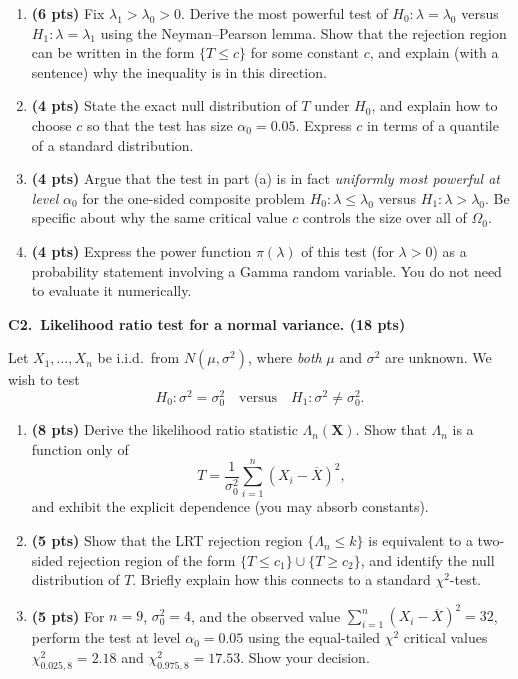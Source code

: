 \documentclass[11pt]{article}
\begin{document}
\begin{enumerate}[label=(\alph*), leftmargin=*]
    \item \textbf{(6 pts)} Fix $\lambda_1 > \lambda_0 > 0$. Derive the most powerful test of $H_0\!: \lambda = \lambda_0$ versus $H_1\!: \lambda = \lambda_1$ using the Neyman--Pearson lemma. Show that the rejection region can be written in the form $\{T \le c\}$ for some constant $c$, and explain (with a sentence) why the inequality is in this direction.
    \item \textbf{(4 pts)} State the exact null distribution of $T$ under $H_0$, and explain how to choose $c$ so that the test has size $\alpha_0 = 0.05$. Express $c$ in terms of a quantile of a standard distribution.
    \item \textbf{(4 pts)} Argue that the test in part (a) is in fact \emph{uniformly most powerful at level} $\alpha_0$ for the one-sided composite problem $H_0\!: \lambda \le \lambda_0$ versus $H_1\!: \lambda > \lambda_0$. Be specific about why the same critical value $c$ controls the size over all of $\Omega_0$.
    \item \textbf{(4 pts)} Express the power function $\pi(\lambda)$ of this test (for $\lambda > 0$) as a probability statement involving a Gamma random variable. You do not need to evaluate it numerically.
\end{enumerate}

\vspace{0.6em}

\textbf{C2.\ Likelihood ratio test for a normal variance. (18 pts)}

Let $X_1, \dots, X_n$ be i.i.d.\ from $N(\mu, \sigma^2)$, where \emph{both} $\mu$ and $\sigma^2$ are unknown. We wish to test
\[
    H_0\!: \sigma^2 = \sigma_0^2 \quad\text{versus}\quad H_1\!: \sigma^2 \neq \sigma_0^2.
\]

\begin{enumerate}[label=(\alph*), leftmargin=*]
    \item \textbf{(8 pts)} Derive the likelihood ratio statistic $\Lambda_n(\mathbf{X})$. Show that $\Lambda_n$ is a function only of
    \[
        T = \frac{1}{\sigma_0^2}\sum_{i=1}^n (X_i - \overline{X})^2,
    \]
    and exhibit the explicit dependence (you may absorb constants).
    \item \textbf{(5 pts)} Show that the LRT rejection region $\{\Lambda_n \le k\}$ is equivalent to a two-sided rejection region of the form $\{T \le c_1\}\cup \{T \ge c_2\}$, and identify the null distribution of $T$. Briefly explain how this connects to a standard $\chi^2$-test.
    \item \textbf{(5 pts)} For $n = 9$, $\sigma_0^2 = 4$, and the observed value $\sum_{i=1}^n(X_i - \overline{X})^2 = 32$, perform the test at level $\alpha_0 = 0.05$ using the equal-tailed $\chi^2$ critical values $\chi^{2}_{0.025, 8} = 2.18$ and $\chi^{2}_{0.975, 8} = 17.53$. Show your decision.
\end{enumerate}
\end{document}
